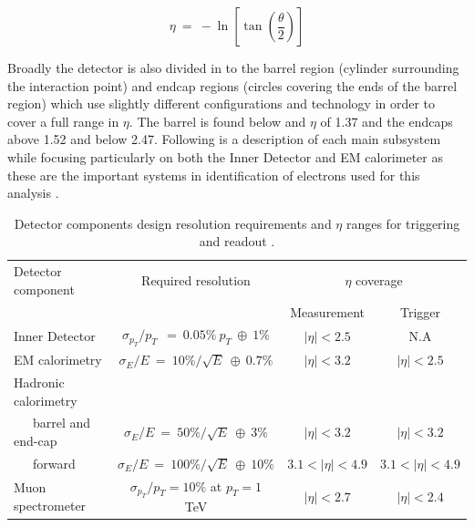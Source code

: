 	\begin{equation}
		\eta~=~-\ln[\tan(\frac{\theta}{2})]
		\label{eq:eta}
	\end{equation}

	Broadly the detector is also divided in to the barrel region (cylinder surrounding the interaction point) and endcap regions (circles covering the ends of the barrel region) which use slightly different configurations and technology in order to cover a full range in $\eta$. The barrel is found below and $\eta$ of 1.37 and the endcaps above 1.52 and below 2.47. Following is a description of each main subsystem while focusing particularly on both the Inner Detector and EM calorimeter as these are the important systems in identification of electrons used for this analysis \cite{Aad:1129811}.


	\begin {table}[h]
	\begin{center}
	\begin{tabular}{ | l | c | c | c | } 
		\hline
		Detector component & Required resolution & \multicolumn{2}{c|}{$\eta$ coverage} \\
		\cline{3-4}
		 & & Measurement & Trigger \\
    	\hline\hline
    	Inner Detector & $\sigma_{p_{T}}/p_{T}~~=~0.05\%~p_{T}~\oplus~1\%$ & $|\eta|<2.5$ & N.A \\
    	\hline
    	EM calorimetry & $\sigma_{E}/E~=~10\%/\sqrt{E}~\oplus~0.7\%$ & $|\eta|<3.2$ & $|\eta|<2.5$ \\
    	\hline
    	Hadronic calorimetry &  &  &  \\
    	~~~barrel and end-cap & $\sigma_{E}/E~=~50\%/\sqrt{E}~\oplus~3\%$ & $|\eta|<3.2$ & $|\eta|<3.2$ \\
    	~~~forward  & $\sigma_{E}/E~=~100\%/\sqrt{E}~\oplus~10\%$ & $3.1<|\eta|<4.9$ & $3.1<|\eta|<4.9$ \\
    	\hline
    	Muon spectrometer & $\sigma_{p_{T}}/p_{T} =10\%$ at $p_{T} = 1$ TeV & $|\eta|<2.7$ & $|\eta|<2.4$ \\
    	\hline
  	\end{tabular}
  	\label{tab:det_res}
  	\caption{Detector components design resolution requirements and $\eta$ ranges for triggering and readout \cite{Aad:1129811}.}
  	\end{center}
	\end {table}




